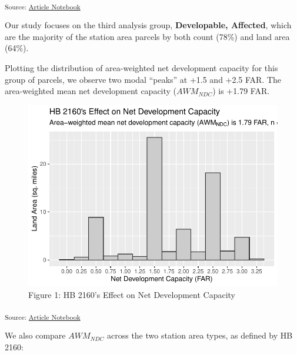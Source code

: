 \documentclass[
]{agujournal2019}
\begin{document}
\textsubscript{Source:
\href{https://tiernanmartin.github.io/2024-transit-oriented-development-bill/index.qmd.html}{Article
Notebook}}

Our study focuses on the third analysis group, \textbf{Developable,
Affected}, which are the majority of the station area parcels by both
count (78\%) and land area (64\%).

Plotting the distribution of area-weighted net development capacity for
this group of parcels, we observe two modal ``peaks'' at +1.5 and +2.5
FAR. The area-weighted mean net development capacity (\(AWM_{NDC}\)) is
+1.79 FAR.

\begin{figure}[H]

{\centering \includegraphics{index_files/figure-pdf/results-histogram-affected-1.pdf}

}

\caption{Figure 1: HB 2160's Effect on Net Development Capacity}

\end{figure}%

\textsubscript{Source:
\href{https://tiernanmartin.github.io/2024-transit-oriented-development-bill/index.qmd.html}{Article
Notebook}}

We also compare \(AWM_{NDC}\) across the two station area types, as
defined by HB 2160:
\end{document}
